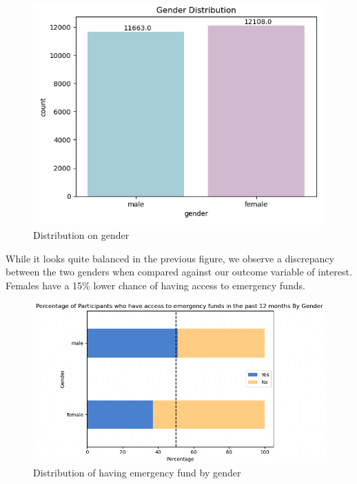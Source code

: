 \documentclass[12pt]{article}
\begin{document}
\begin{figure}

{\centering \includegraphics[width=1\linewidth]{graphs/f24_graph2} 

}

\caption{Distribution on gender}\label{fig:unnamed-chunk-5}
\end{figure}

While it looks quite balanced in the previous figure, we observe a
discrepancy between the two genders when compared against our outcome
variable of interest. Females have a 15\% lower chance of having access
to emergency funds.

\begin{figure}

{\centering \includegraphics[width=1\linewidth]{graphs/f24_graph3} 

}

\caption{Distribution of having emergency fund by gender}\label{fig:unnamed-chunk-6}
\end{figure}
\end{document}
